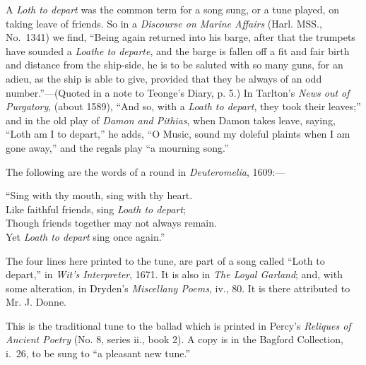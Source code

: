 A \textit{Loth to depart} was the common term for a song sung, or a tune played, on
taking leave of friends. So in a \textit{Discourse on Marine Affairs} (Harl. MSS.,
No.~1341) we find, “Being again returned into his barge, after that the trumpets
have sounded a \textit{Loathe to departe}, and the barge is fallen off a fit and fair birth
and distance from the ship-side, he is to be saluted with so many guns, for an
adieu, as the ship is able to give, provided that they be always of an odd
number.”—(Quoted in a note to Teonge’s Diary, p. 5.) In Tarlton’s \textit{News out of
Purgatory}, (about 1589), “And so, with a \textit{Loath to depart}, they took their
leaves;” and in the old play of \textit{Damon and Pithias}, when Damon takes leave,
saying, “Loth am I to depart,” he adds, “O Music, sound my doleful plaints
when I am gone away,” and the regals play “a mourning song.”

The following are the words of a round in \textit{Deuteromelia}, 1609:—
\settowidth{\versewidth}{Sing with thy mouth, sing with thy heart.}
\begin{scverse}
“Sing with thy mouth, sing with thy heart.\\
Like faithful friends, sing \textit{Loath to depart};\\
Though friends together may not always remain.\\
Yet \textit{Loath to depart} sing once again.”
\end{scverse}

The four lines here printed to the tune, are part of a song called “Loth to
depart,” in \textit{Wit’s Interpreter}, 1671. It is also in \textit{The Loyal Garland}; and, with
some alteration, in Dryden’s \textit{Miscellany Poems}, iv., 80. It is there attributed to
Mr. J. Donne.



\pagebreak


This is the traditional tune to the ballad which is printed in Percy’s \textit{Reliques
of Ancient Poetry} (No. 8, series ii., book 2). A copy is in the Bagford Collection,
i.~26, to be sung to “a pleasant new tune.”





